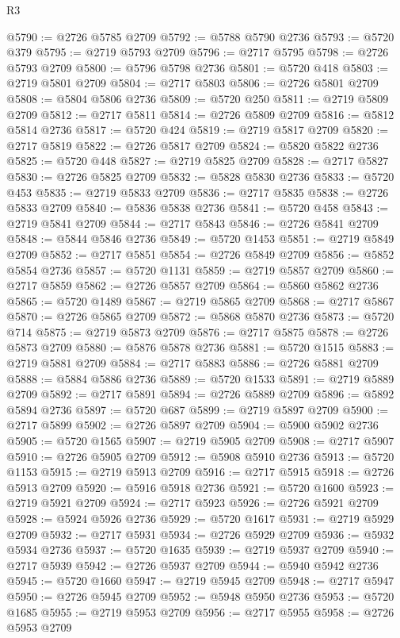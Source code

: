 \begin{lexlean}{R3}
\begin{coremodule}
@5790 := @2726 @5785 @2709
@5792 := @5788 @5790 @2736
@5793 := @5720 @379
@5795 := @2719 @5793 @2709
@5796 := @2717 @5795
@5798 := @2726 @5793 @2709
@5800 := @5796 @5798 @2736
@5801 := @5720 @418
@5803 := @2719 @5801 @2709
@5804 := @2717 @5803
@5806 := @2726 @5801 @2709
@5808 := @5804 @5806 @2736
@5809 := @5720 @250
@5811 := @2719 @5809 @2709
@5812 := @2717 @5811
@5814 := @2726 @5809 @2709
@5816 := @5812 @5814 @2736
@5817 := @5720 @424
@5819 := @2719 @5817 @2709
@5820 := @2717 @5819
@5822 := @2726 @5817 @2709
@5824 := @5820 @5822 @2736
@5825 := @5720 @448
@5827 := @2719 @5825 @2709
@5828 := @2717 @5827
@5830 := @2726 @5825 @2709
@5832 := @5828 @5830 @2736
@5833 := @5720 @453
@5835 := @2719 @5833 @2709
@5836 := @2717 @5835
@5838 := @2726 @5833 @2709
@5840 := @5836 @5838 @2736
@5841 := @5720 @458
@5843 := @2719 @5841 @2709
@5844 := @2717 @5843
@5846 := @2726 @5841 @2709
@5848 := @5844 @5846 @2736
@5849 := @5720 @1453
@5851 := @2719 @5849 @2709
@5852 := @2717 @5851
@5854 := @2726 @5849 @2709
@5856 := @5852 @5854 @2736
@5857 := @5720 @1131
@5859 := @2719 @5857 @2709
@5860 := @2717 @5859
@5862 := @2726 @5857 @2709
@5864 := @5860 @5862 @2736
@5865 := @5720 @1489
@5867 := @2719 @5865 @2709
@5868 := @2717 @5867
@5870 := @2726 @5865 @2709
@5872 := @5868 @5870 @2736
@5873 := @5720 @714
@5875 := @2719 @5873 @2709
@5876 := @2717 @5875
@5878 := @2726 @5873 @2709
@5880 := @5876 @5878 @2736
@5881 := @5720 @1515
@5883 := @2719 @5881 @2709
@5884 := @2717 @5883
@5886 := @2726 @5881 @2709
@5888 := @5884 @5886 @2736
@5889 := @5720 @1533
@5891 := @2719 @5889 @2709
@5892 := @2717 @5891
@5894 := @2726 @5889 @2709
@5896 := @5892 @5894 @2736
@5897 := @5720 @687
@5899 := @2719 @5897 @2709
@5900 := @2717 @5899
@5902 := @2726 @5897 @2709
@5904 := @5900 @5902 @2736
@5905 := @5720 @1565
@5907 := @2719 @5905 @2709
@5908 := @2717 @5907
@5910 := @2726 @5905 @2709
@5912 := @5908 @5910 @2736
@5913 := @5720 @1153
@5915 := @2719 @5913 @2709
@5916 := @2717 @5915
@5918 := @2726 @5913 @2709
@5920 := @5916 @5918 @2736
@5921 := @5720 @1600
@5923 := @2719 @5921 @2709
@5924 := @2717 @5923
@5926 := @2726 @5921 @2709
@5928 := @5924 @5926 @2736
@5929 := @5720 @1617
@5931 := @2719 @5929 @2709
@5932 := @2717 @5931
@5934 := @2726 @5929 @2709
@5936 := @5932 @5934 @2736
@5937 := @5720 @1635
@5939 := @2719 @5937 @2709
@5940 := @2717 @5939
@5942 := @2726 @5937 @2709
@5944 := @5940 @5942 @2736
@5945 := @5720 @1660
@5947 := @2719 @5945 @2709
@5948 := @2717 @5947
@5950 := @2726 @5945 @2709
@5952 := @5948 @5950 @2736
@5953 := @5720 @1685
@5955 := @2719 @5953 @2709
@5956 := @2717 @5955
@5958 := @2726 @5953 @2709

\end{coremodule}
\end{lexlean}
